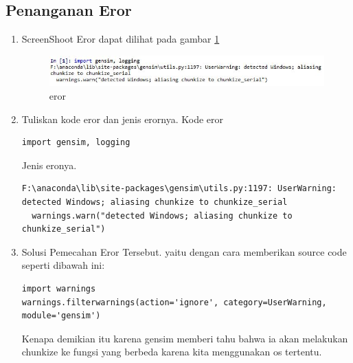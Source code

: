 \subsection{Penanganan Eror}
\begin{enumerate}
\item ScreenShoot Eror dapat dilihat pada gambar \ref{c5_31}
\begin{figure}[!htbp]
	\centerline{\includegraphics[width=1\textwidth]{figures/huda/chapter5/eror.JPG}}
	\caption{eror}
	\label{c5_31}
\end{figure}
\item Tuliskan kode eror dan jenis erornya.
\subitem Kode eror
\begin{verbatim}
import gensim, logging
\end{verbatim}
\subitem Jenis eronya.
\begin{verbatim}
F:\anaconda\lib\site-packages\gensim\utils.py:1197: UserWarning: detected Windows; aliasing chunkize to chunkize_serial
  warnings.warn("detected Windows; aliasing chunkize to chunkize_serial")
\end{verbatim}
\item Solusi Pemecahan Eror Tersebut.
\subitem yaitu dengan cara memberikan source code seperti dibawah ini:
\begin{verbatim}
import warnings
warnings.filterwarnings(action='ignore', category=UserWarning, module='gensim')
\end{verbatim}
\subitem Kenapa demikian itu karena gensim memberi tahu bahwa ia akan melakukan chunkize ke fungsi yang berbeda karena kita menggunakan os tertentu.
\end{enumerate}